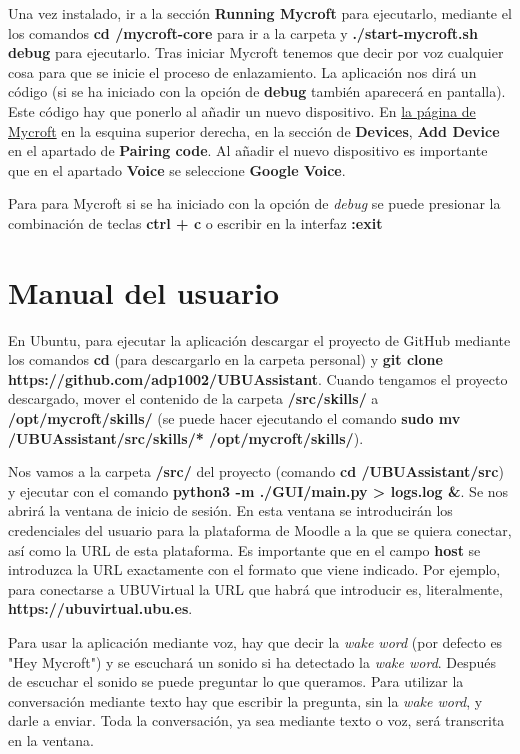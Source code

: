 Una vez instalado, ir a la sección \textbf{Running Mycroft} para ejecutarlo, mediante el los comandos \textbf{cd \detokenize{~}/mycroft-core} para ir a la carpeta y \textbf{./start-mycroft.sh debug} para ejecutarlo. Tras iniciar Mycroft tenemos que decir por voz cualquier cosa para que se inicie el proceso de enlazamiento. La aplicación nos dirá un código (si se ha iniciado con la opción de \textbf{debug} también aparecerá en pantalla). Este código hay que ponerlo al añadir un nuevo dispositivo. En \href{https://home.mycroft.ai}{la página de Mycroft} en la esquina superior derecha, en la sección de \textbf{Devices}, \textbf{Add Device} en el apartado de \textbf{Pairing code}. Al añadir el nuevo dispositivo es importante que en el apartado \textbf{Voice} se seleccione \textbf{Google Voice}.

Para para Mycroft si se ha iniciado con la opción de \textit{debug} se puede presionar la combinación de teclas \textbf{ctrl + c} o escribir en la interfaz \textbf{:exit}


\section{Manual del usuario}

En Ubuntu, para ejecutar la aplicación descargar el proyecto de GitHub mediante los comandos \textbf{cd \detokenize{~}} (para descargarlo en la carpeta personal) y \textbf{git clone https://github.com/adp1002/UBUAssistant}. Cuando tengamos el proyecto descargado, mover el contenido de la carpeta \textbf{\detokenize{~}/src/skills/} a \textbf{/opt/mycroft/skills/} (se puede hacer ejecutando el comando \textbf{sudo mv \detokenize{~}/UBUAssistant/src/skills/* /opt/mycroft/skills/}).

Nos vamos a la carpeta \textbf{/src/} del proyecto (comando \textbf{cd \detokenize{~}/UBUAssistant/src}) y ejecutar con el comando \textbf{python3 -m ./GUI/main.py \detokenize{>}> logs.log \&}. Se nos abrirá la ventana de inicio de sesión. En esta ventana se introducirán los credenciales del usuario para la plataforma de Moodle a la que se quiera conectar, así como la URL de esta plataforma.
Es importante que en el campo \textbf{host} se introduzca la URL exactamente con el formato que viene indicado. Por ejemplo, para conectarse a UBUVirtual la URL que habrá que introducir es, literalmente, \textbf{https://ubuvirtual.ubu.es}.

Para usar la aplicación mediante voz, hay que decir la \textit{wake word} (por defecto es "Hey Mycroft") y se escuchará un sonido si ha detectado la \textit{wake word}. Después de escuchar el sonido se puede preguntar lo que queramos. Para utilizar la conversación mediante texto hay que escribir la pregunta, sin la \textit{wake word}, y darle a enviar. Toda la conversación, ya sea mediante texto o voz, será transcrita en la ventana.

